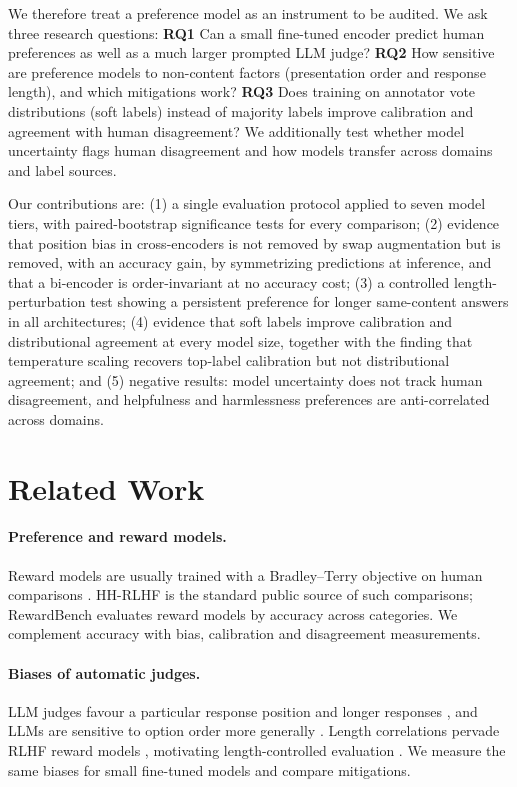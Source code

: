 \documentclass[11pt]{article}
\begin{document}
We therefore treat a preference model as an instrument to be audited. We ask three research questions:
\textbf{RQ1} Can a small fine-tuned encoder predict human preferences as well as a much larger prompted LLM judge?
\textbf{RQ2} How sensitive are preference models to non-content factors (presentation order and response length), and which mitigations work?
\textbf{RQ3} Does training on annotator vote distributions (soft labels) instead of majority labels improve calibration and agreement with human disagreement?
We additionally test whether model uncertainty flags human disagreement and how models transfer across domains and label sources.

Our contributions are: (1) a single evaluation protocol applied to seven model tiers, with paired-bootstrap significance tests for every comparison; (2) evidence that position bias in cross-encoders is not removed by swap augmentation but is removed, with an accuracy gain, by symmetrizing predictions at inference, and that a bi-encoder is order-invariant at no accuracy cost; (3) a controlled length-perturbation test showing a persistent preference for longer same-content answers in all architectures; (4) evidence that soft labels improve calibration and distributional agreement at every model size, together with the finding that temperature scaling recovers top-label calibration but not distributional agreement; and (5) negative results: model uncertainty does not track human disagreement, and helpfulness and harmlessness preferences are anti-correlated across domains.

\section{Related Work}

\paragraph{Preference and reward models.}
Reward models are usually trained with a Bradley--Terry objective \citep{bradley1952rank} on human comparisons \citep{christiano2017deep,stiennon2020learning,ouyang2022training}. HH-RLHF \citep{bai2022training} is the standard public source of such comparisons; RewardBench \citep{lambert2024rewardbench} evaluates reward models by accuracy across categories. We complement accuracy with bias, calibration and disagreement measurements.

\paragraph{Biases of automatic judges.}
LLM judges favour a particular response position and longer responses \citep{zheng2023judging,wang2023large}, and LLMs are sensitive to option order more generally \citep{pezeshkpour2023large}. Length correlations pervade RLHF reward models \citep{singhal2023long}, motivating length-controlled evaluation \citep{dubois2024length}. We measure the same biases for small fine-tuned models and compare mitigations.
\end{document}
